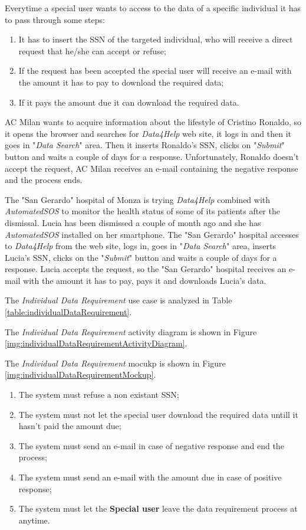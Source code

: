 Everytime a special user wants to access to the data of a specific individual it has to pass through some steps:
\begin{enumerate}
  \item It has to insert the SSN of the targeted individual, who will receive a direct request that he/she can accept or refuse;
  \item If the request has been accepted the special user will receive an e-mail with the amount it has to pay to download the required data;
  \item If it pays the amount due it can download the required data.
\end{enumerate}

AC Milan wants to acquire information about the lifestyle of Cristino Ronaldo, so it opens the browser and searches for \textit{Data4Help} web site, it logs in and then it goes in "\textit{Data Search}" area. Then it inserts Ronaldo's SSN, clicks on "\textit{Submit}" button and waits a couple of days for a response. Unfortunately, Ronaldo doesn't accept the request, AC Milan receives an e-mail containing the negative response and the process ends.

The "San Gerardo" hospital of Monza is trying \textit{Data4Help} combined with \textit{AutomatedSOS} to monitor the health status of some of its patients after the dismissal. Lucia has been dismissed a couple of month ago and she has \textit{AutomatedSOS} installed on her smartphone. The "San Gerardo" hospital accesses to \textit{Data4Help} from the web site, logs in, goes in "\textit{Data Search}" area, inserts Lucia's SSN, clicks on the "\textit{Submit}" button and waits a couple of days for a response. Lucia accepts the request, so the "San Gerardo" hospital receives an e-mail with the amount  it has to pay, pays it and downloads Lucia's data.

The \textit{Individual Data Requirement} use case is analyzed in Table \ref{table:individualDataRequirement}.

The \textit{Individual Data Requirement} activity diagram is shown in Figure \ref{img:individualDataRequirementActivityDiagram}.

The \textit{Individual Data Requirement} mocukp is shown in Figure \ref{img:individualDataRequirementMockup}.

\begin{enumerate}
  \item The system must refuse a non existant SSN;
  \item The system must not let the special user download the required data untill it hasn't paid the amount due;
  \item The system must send an e-mail in case of negative response and end the process;
  \item The system must send an e-mail with the amount due in case of positive response;
  \item The system must let the \textbf{Special user} leave the data requirement process at anytime.
\end{enumerate}


